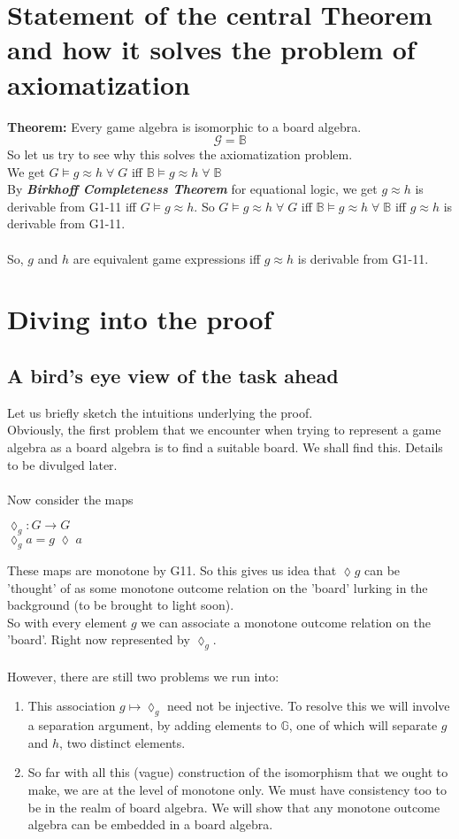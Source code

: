 \documentclass[12pt]{article}
\begin{document}
\section{Statement of the central Theorem and how it solves the problem of axiomatization}
\textbf{Theorem:} Every game algebra is isomorphic to a board algebra. 
\[
\mathcal{G}=\mathbb{B}\]
So let us try to see why this solves the axiomatization problem.\\ We get $G \vDash g \approx h  \; \forall \; G$ iff $\mathbb{B} \vDash g \approx h \; \forall \; \mathbb{B}$ \\
By \textbf{\emph{Birkhoff Completeness Theorem}} for equational logic, we get $g \approx h$ is derivable from G1-11 iff $G \vDash g \approx h$. So $G \vDash g \approx h \; \forall \; G$ iff $\mathbb{B} \vDash g \approx h \; \forall \; \mathbb{B}$ iff $g \approx h$ is derivable from G1-11.\\ \\
So, $g$ and $h$ are equivalent game expressions iff $g \approx h$ is derivable from G1-11. 
\section{Diving into the proof}
\subsection{A bird's eye view of the task ahead}
Let us briefly sketch the intuitions underlying the proof. \\
Obviously, the first problem that we encounter when trying to represent a game algebra as a board algebra is to find a suitable board. We shall find this. Details to be divulged later. \\ \\
Now consider the maps \\
\begin{center}
   $\lozenge_{g}: G \to G$ \\
   $\lozenge_{g}a=g \; \lozenge \; a$ \\
\end{center}
These maps are monotone by G11. So this gives us idea that $\lozenge g$ can be 'thought' of as some monotone outcome relation on the 'board' lurking in the background (to be brought to light soon).\\
So with every element $g$ we can associate a monotone outcome relation on the 'board'. Right now represented by $\lozenge_g$. \\ \\
However, there are still two problems we run into: 
\begin{enumerate}
    \item This association $g \mapsto\lozenge_g$ need not be injective. To resolve this we will involve a separation argument, by adding elements to $\mathbb{G}$, one of which will separate $g$ and $h$, two distinct elements. 
    \item So far with all this (vague) construction of the isomorphism that we ought to make, we are at the level of monotone only. We must have consistency too to be in the realm of board algebra. We will show that any monotone outcome algebra can be embedded in a board algebra. 
\end{enumerate}
\end{document}
